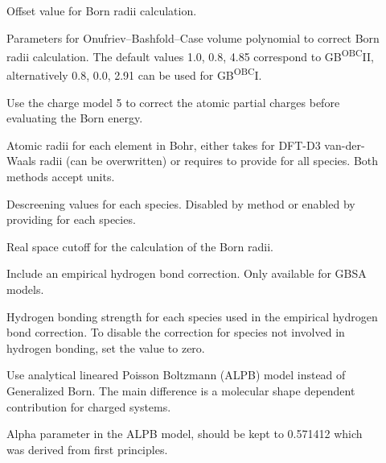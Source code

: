 \begin{description}
  \item[] 
    Offset value for Born radii calculation.

  \item[] Parameters for Onufriev--Bashfold--Case volume
    polynomial to correct Born radii calculation.
    The default values 1.0, 0.8, 4.85 correspond to GB\textsuperscript{OBC}II,
    alternatively 0.8, 0.0, 2.91 can be used for GB\textsuperscript{OBC}I.\cite{onufriev2004}

  \item[] Use the charge model 5 to correct the atomic partial charges
    before evaluating the Born energy.

  \item[] Atomic radii for each element in Bohr, either takes
     for DFT-D3 van-der-Waals radii (can be overwritten)
    or requires to provide  for all species.
    Both methods accept  units.

  \item[] Descreening values for each species.
    Disabled by  method or enabled by providing 
    for each species.

  \item[] 
    Real space cutoff for the calculation of the Born radii.

  \item[]
    Include an empirical hydrogen bond correction.
    Only available for GBSA models.

  \item[]
    Hydrogen bonding strength for each species used in the empirical hydrogen
    bond correction. To disable the correction for species not involved
    in hydrogen bonding, set the value to zero.

  \item[]
    Use analytical lineared Poisson Boltzmann (ALPB) model\cite{sigalov2006}
    instead of Generalized Born.
    The main difference is a molecular shape dependent contribution for charged
    systems.

  \item[]
    Alpha parameter in the ALPB model, should be kept to 0.571412 which was
    derived from first principles.\cite{sigalov2006}
\end{description}

